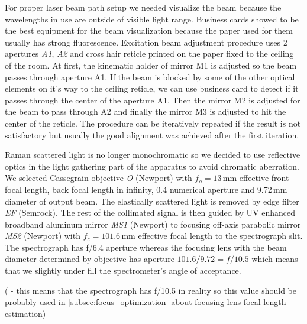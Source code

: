 For proper laser beam path setup we needed visualize the beam because the
wavelengths in use are outside of visible light range. Business cards showed
to be the best equipment for the beam visualization because the paper used for
them usually has strong fluorescence. Excitation beam adjustment procedure
uses 2 apertures \emph{A1}, \emph{A2} and cross hair reticle printed on the
paper fixed to the ceiling of the room. At first, the kinematic holder of
mirror M1 is adjusted so the beam passes through aperture A1. If the beam is
blocked by some of the other optical elements on it's way to the ceiling
reticle, we can use business card to detect if it passes through the center
of the aperture A1. Then the mirror M2 is adjusted for the beam to pass
through A2 and finally the mirror M3 is adjusted to hit the center of the
reticle. The procedure can be iteratively repeated if the result is not
satisfactory but usually the good alignment was achieved after the first
iteration.

Raman scattered light is no longer monochromatic so we decided to use
reflective optics in the light gathering part of the apparatus to avoid
chromatic aberration. We selected Cassegrain objective \emph{O} (Newport) with
$f_o = 13$\,mm effective front focal length, back focal length in infinity,
0.4 numerical aperture and 9.72\,mm diameter of output beam. The elastically
scattered light is removed by edge filter \emph{EF} (Semrock). The rest of the
collimated signal is then guided by UV enhanced broadband aluminum mirror
\emph{MS1} (Newport) to focusing off-axis parabolic mirror \emph{MS2}
(Newport) with $f_c = 101.6$\,mm effective focal length to the spectrograph
slit. The spectrograph has f/6.4 aperture whereas the focusing lens with the
beam diameter determined by objective has aperture $101.6 / 9.72 = f/10.5$
which means that we slightly under fill the spectrometer's angle of acceptance.

(\INCONSISTENCY{} - this means that the spectrograph has f/10.5 in reality so
this value should be probably used in \cref{subsec:focus_optimization} about
focusing lens focal length estimation)
